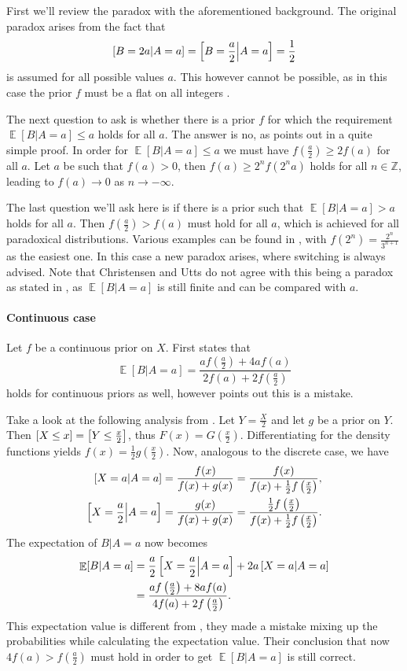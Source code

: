 \documentclass[twoside,a4paper]{article}
\theoremstyle{plain}
\theoremstyle{definition}
\theoremstyle{remark}
\numberwithin{equation}{section}
\newcommand{\Z}{\mathbb{Z}}
\let\P\relax
\DeclareMathOperator{\P}{\mathbb{P}}
\DeclareMathOperator{\E}{\mathbb{E}}
\DeclareMathOperator{\1}{\mathbbm{1}}
\begin{document}
First we'll review the paradox with the aforementioned background. The original paradox arises from the fact that \[\P[B=2a|A=a]=\P\left[B=\frac{a}{2}\middle|A=a\right]=\frac{1}{2}\] is assumed for all possible values $a$. This however cannot be possible, as in this case the prior $f$ must be a flat on all integers \cite{Christensen92,Christensen93b}.

The next question to ask is whether there is a prior $f$ for which the requirement $\E[B|A=a]\leq a$ holds for all $a$. The answer is no, as \cite{Brams95} points out in a quite simple proof. In order for $\E[B|A=a]\leq a$ we must have $f\left(\frac{a}{2}\right)\geq2f(a)$ for all $a$. Let $a$ be such that $f(a)>0$, then $f\left(a\right)\geq 2^{n}f(2^na)$ holds for all $n\in\Z$, leading to $f(a)\to0$ as $n\to-\infty$.

The last question we'll ask here is if there is a prior such that $\E[B|A=a]>a$ holds for all $a$. Then $f\left(\frac{a}{2}\right)>f(a)$ must hold for all $a$, which is achieved for all paradoxical distributions. Various examples can be found in \cite{Christensen93a,Linzer94,Broome95}, with $f(2^n)=\frac{2^n}{3^{n+1}}$ as the easiest one. In this case a new paradox arises, where switching is always advised. Note that Christensen and Utts do not agree with this being a paradox as stated in \cite{Christensen93a}, as $\E[B|A=a]$ is still finite and can be compared with $a$.
\paragraph{Continuous case}
Let $f$ be a continuous prior on $X$. First \cite{Christensen92} states that \[\E[B|A=a]=\frac{af\left(\frac{a}{2}\right)+4af(a)}{2f(a)+2f\left(\frac{a}{2}\right)}\] holds for continuous priors as well, however \cite{Christensen96} points out this is a mistake.

Take a look at the following analysis from \cite{Brams95}. Let $Y=\frac{X}{2}$ and let $g$ be a prior on $Y$. Then $\P[X\leq x]=\P\left[Y\leq \frac{x}{2}\right]$, thus $F(x)=G\left(\frac{x}{2}\right)$. Differentiating for the density functions yields $f(x)=\frac{1}{2}g\left(\frac{x}{2}\right)$. Now, analogous to the discrete case, we have
\begin{align*}
\P[X=a|A=a]&=\frac{f(x)}{f(x)+g(x)}=\frac{f(x)}{f(x)+\frac{1}{2}f\left(\frac{x}{2}\right)},\\
\P\left[X=\frac{a}{2}\middle|A=a\right]&=\frac{g(x)}{f(x)+g(x)}=\frac{\frac{1}{2}f\left(\frac{x}{2}\right)}{f(x)+\frac{1}{2}f\left(\frac{x}{2}\right)}.
\end{align*}
The expectation of $B|A=a$ now becomes
\begin{align*}
\E[B|A=a]&=\frac{a}{2}\P\left[X=\frac{a}{2}\middle|A=a\right]+2a\P\left[X=a\middle|A=a\right]\\
&=\frac{af\left(\frac{a}{2}\right)+8af(a)}{4f(a)+2f\left(\frac{a}{2}\right)}.
\end{align*}
This expectation value is different from \cite{Christensen96}, they made a mistake mixing up the probabilities while calculating the expectation value. Their conclusion that now $4f(a)>f\left(\frac{a}{2}\right)$ must hold in order to get $\E[B|A=a]$ is still correct.
\end{document}
